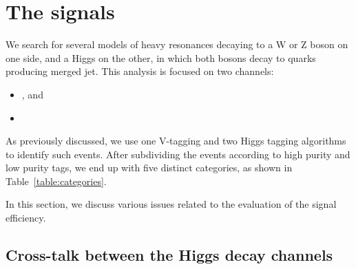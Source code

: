 \section{The signals}
\label{sec:signal}

We search for several models of heavy resonances decaying to
a W or Z boson on one side, and a Higgs on the other, in which both bosons 
decay to quarks producing merged jet.  This analysis is focused on two
channels:
\begin{itemize}
\item \HbbVqq, and
\item \HwwVqq
\end{itemize}
As previously discussed, we use one V-tagging and two Higgs tagging algorithms
to identify such events.  After subdividing the events according to 
high purity and low purity tags, we end up with five distinct categories,
as shown in Table~\ref{table:categories}.

In this section, we discuss various issues related to the evaluation
of the signal efficiency.




\subsection{Cross-talk between the Higgs decay channels}
\label{sec:cross-talk}


